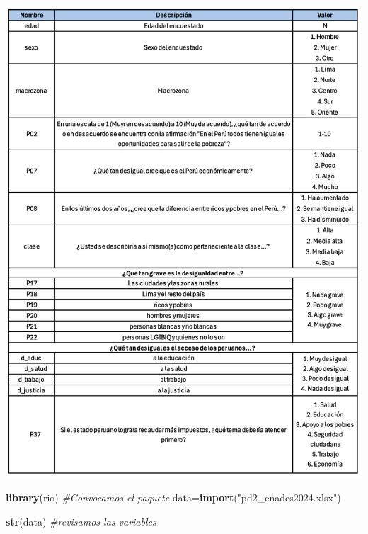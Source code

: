 \documentclass[
]{article}
\newenvironment{Shaded}{\begin{snugshade}}{\end{snugshade}}
\newcommand{\CommentTok}[1]{\textcolor[rgb]{0.56,0.35,0.01}{\textit{#1}}}
\newcommand{\FunctionTok}[1]{\textcolor[rgb]{0.13,0.29,0.53}{\textbf{#1}}}
\newcommand{\NormalTok}[1]{#1}
\newcommand{\OtherTok}[1]{\textcolor[rgb]{0.56,0.35,0.01}{#1}}
\newcommand{\StringTok}[1]{\textcolor[rgb]{0.31,0.60,0.02}{#1}}
\begin{document}
\begin{center}\includegraphics[width=1\linewidth]{diccionario_enades2024} \end{center}

\begin{Shaded}
\begin{Highlighting}[]
\FunctionTok{library}\NormalTok{(rio) }\CommentTok{\#Convocamos el paquete   }
\NormalTok{data}\OtherTok{=}\FunctionTok{import}\NormalTok{(}\StringTok{"pd2\_enades2024.xlsx"}\NormalTok{)}
\end{Highlighting}
\end{Shaded}

\begin{Shaded}
\begin{Highlighting}[]
\FunctionTok{str}\NormalTok{(data) }\CommentTok{\#revisamos las variables}
\end{Highlighting}
\end{Shaded}
\end{document}
